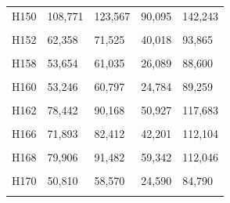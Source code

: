 \documentclass[
  a4paper,
  titlepage]{article}
\begin{document}
\begin{longtable}[t]{lllll}
H150 & 108,771 & 123,567 & 90,095 & 142,243\\
 
\cellcolor{gray!6}{H151} & \cellcolor{gray!6}{94,397} & \cellcolor{gray!6}{107,756} & \cellcolor{gray!6}{68,234} & \cellcolor{gray!6}{133,919}\\
 
H152 & 62,358 & 71,525 & 40,018 & 93,865\\
 
\cellcolor{gray!6}{H157} & \cellcolor{gray!6}{64,942} & \cellcolor{gray!6}{74,400} & \cellcolor{gray!6}{39,072} & \cellcolor{gray!6}{100,270}\\
 
H158 & 53,654 & 61,035 & 26,089 & 88,600\\
 
\cellcolor{gray!6}{H159} & \cellcolor{gray!6}{74,064} & \cellcolor{gray!6}{85,138} & \cellcolor{gray!6}{47,579} & \cellcolor{gray!6}{111,623}\\
 
H160 & 53,246 & 60,797 & 24,784 & 89,259\\
 
\cellcolor{gray!6}{H161} & \cellcolor{gray!6}{66,850} & \cellcolor{gray!6}{76,769} & \cellcolor{gray!6}{36,888} & \cellcolor{gray!6}{106,731}\\
 
H162 & 78,442 & 90,168 & 50,927 & 117,683\\
 
\cellcolor{gray!6}{H164} & \cellcolor{gray!6}{103,321} & \cellcolor{gray!6}{118,527} & \cellcolor{gray!6}{75,413} & \cellcolor{gray!6}{146,435}\\
 
H166 & 71,893 & 82,412 & 42,201 & 112,104\\
 
\cellcolor{gray!6}{H167} & \cellcolor{gray!6}{54,620} & \cellcolor{gray!6}{62,594} & \cellcolor{gray!6}{26,469} & \cellcolor{gray!6}{90,745}\\
 
H168 & 79,906 & 91,482 & 59,342 & 112,046\\
 
\cellcolor{gray!6}{H169} & \cellcolor{gray!6}{67,782} & \cellcolor{gray!6}{77,408} & \cellcolor{gray!6}{34,522} & \cellcolor{gray!6}{110,668}\\
 
H170 & 50,810 & 58,570 & 24,590 & 84,790\\
 
\cellcolor{gray!6}{H171} & \cellcolor{gray!6}{88,020} & \cellcolor{gray!6}{101,410} & \cellcolor{gray!6}{68,335} & \cellcolor{gray!6}{121,095}\\
 

\end{longtable}
\end{document}
